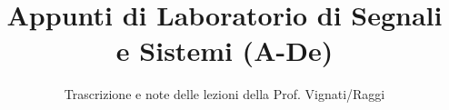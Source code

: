 \documentclass[a4paper,12pt]{article}
\title{Appunti di Laboratorio di Segnali e Sistemi (A-De)}
\author{Trascrizione e note delle lezioni della Prof. Vignati/Raggi}
\date{}
\begin{document}
\maketitle
\projectintro
\tableofcontents
\newpage

\end{document}
